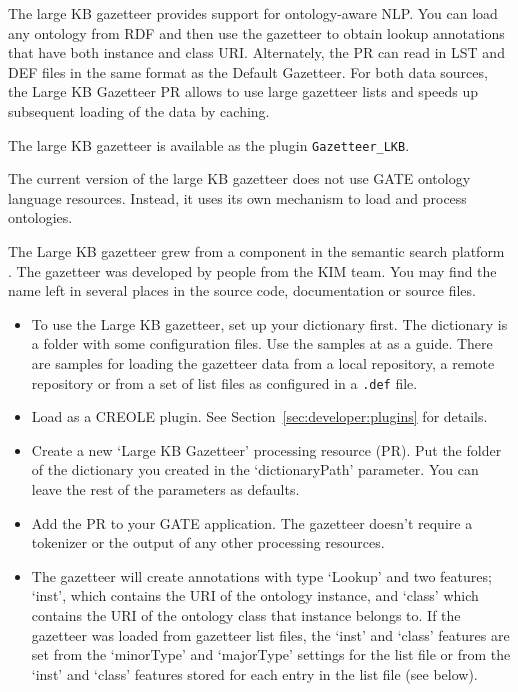 The large KB gazetteer provides support for ontology-aware NLP. You can load
any ontology from RDF and then use the gazetteer to obtain lookup annotations
that have both instance and class URI. Alternately, the PR can read in
LST and DEF files in the same format as the Default Gazetteer. For both
data sources, the Large KB Gazetteer PR allows to use large gazetteer
lists and speeds up subsequent loading of the data by caching.

The large KB gazetteer is available as the plugin \texttt{Gazetteer\_LKB}.

The current version of the large KB gazetteer does not use GATE ontology
language resources. Instead, it uses its own mechanism to load and
process ontologies. 

The Large KB gazetteer grew from a component in the semantic search platform
. The gazetteer was developed by
people from the KIM team. You
may find the name  left in several places in the source code,
documentation or source files.


\begin{itemize}
\item{} To use the Large KB gazetteer, set up your dictionary first. The
dictionary is a folder with some configuration files. Use the samples at
 as a guide. There are 
samples for loading the gazetteer data from a local repository, a remote
repository or from a set of list files as configured in a \texttt{.def} file.

\item{} Load  as a CREOLE plugin.
See Section~\ref{sec:developer:plugins} for details.

\item{} Create a new `Large KB Gazetteer' processing resource (PR). Put the
folder of the dictionary you created in the `dictionaryPath' parameter. You can
leave the rest of the parameters as defaults.

\item{} Add the PR to your GATE application. The gazetteer doesn't require a
tokenizer or the output of any other processing resources.

\item{} The gazetteer will create annotations with type `Lookup' and two
features; `inst', which contains the URI of the ontology instance, and `class'
which contains the URI of the ontology class that instance belongs to. If
the gazetteer was loaded from gazetteer list files, the `inst' and `class'
features are set from the `minorType' and `majorType' settings for the list
file or from the `inst' and `class' features stored for each entry in
the list file (see below).
\end{itemize}

